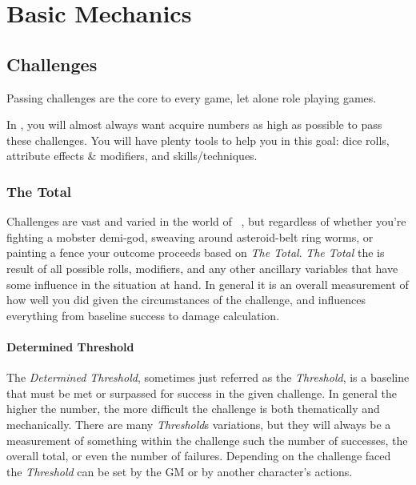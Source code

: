 \part{Basic Mechanics}\label{part:basics}
\chapter{Challenges}\label{ch:challenges}
Passing challenges are the core to every game, let alone role playing games. 

In \gametitlemini, you will almost always want acquire numbers as
high as possible to pass these challenges. You will have plenty tools
to help you in this goal: dice rolls, attribute effects \& modifiers,
and skills/techniques. 

\section{The Total}\label{sec:thetotal}
Challenges are vast and varied in the world of \gametitlemini\ , but regardless of whether you're fighting a mobster demi-god, sweaving around asteroid-belt ring worms, or painting a fence your outcome proceeds based on \emph{The Total}. \emph{The Total} the is result of all possible rolls, modifiers, and any other ancillary variables that have some influence in the situation at hand. In general it is an overall measurement of how well you did given the circumstances of the challenge, and influences everything from baseline success to damage calculation.

\subsection{Determined Threshold}\label{subsec:determined_threshold}
The \emph{Determined Threshold}, sometimes just referred as the \emph{Threshold}, is a baseline that must be met or surpassed for success in the given challenge. In general the higher the number, the more difficult the challenge is both thematically and mechanically. There are many \emph{Threshold}s variations, but they will always be a measurement of something within the challenge such the number of successes, the overall total, or even the number of failures. Depending on the challenge faced the \emph{Threshold} can be set by the GM or by another character's actions.



